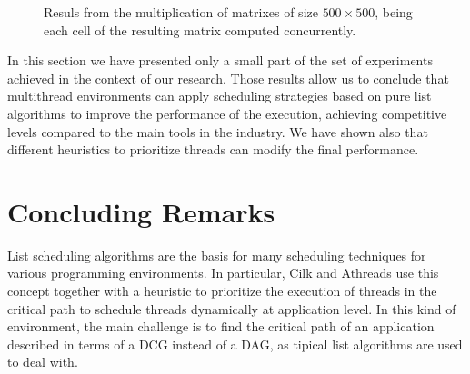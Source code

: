 \documentclass[twocolumn]{svjour3}
\begin{document}
\begin{figure}


\caption{Resuls from the multiplication of matrixes of size $500 \times 500$, being each cell of the resulting matrix computed concurrently.}
\label{fig:MM}
\end{figure}

In this section we have presented only a small part of the set of experiments achieved in the context of our research. Those results allow us to conclude that multithread environments can apply scheduling strategies based on pure list algorithms to improve the performance of the execution, achieving competitive levels compared to the main tools in the industry. We have shown also that different heuristics to prioritize threads can modify the final performance.

\section{Concluding Remarks}\label{sec:conclusion}

List scheduling algorithms are the basis for many scheduling techniques for various programming environments. In particular, Cilk and Athreads use this concept together with a heuristic to prioritize the execution of threads in the critical path to schedule threads dynamically at application level. In this kind of environment, the main challenge is to find the critical path of an application described in terms of a DCG instead of a DAG, as tipical list algorithms are used to deal with.
\end{document}
